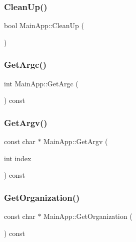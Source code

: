 \subsubsection{\texorpdfstring{CleanUp()}{CleanUp()}}
{\footnotesize\ttfamily bool Main\+App\+::\+Clean\+Up (\begin{DoxyParamCaption}{ }\end{DoxyParamCaption})}

\mbox{\label{class_main_app_a9a114ab6796b54d741bf2542432c2657}} 
\subsubsection{\texorpdfstring{GetArgc()}{GetArgc()}}
{\footnotesize\ttfamily int Main\+App\+::\+Get\+Argc (\begin{DoxyParamCaption}{ }\end{DoxyParamCaption}) const}

\mbox{\label{class_main_app_a380ad5dbdbfc0e00862af9ed2e31ce6b}} 
\subsubsection{\texorpdfstring{GetArgv()}{GetArgv()}}
{\footnotesize\ttfamily const char $\ast$ Main\+App\+::\+Get\+Argv (\begin{DoxyParamCaption}\item[{int}]{index }\end{DoxyParamCaption}) const}

\mbox{\label{class_main_app_aa5614899d2bedcdf809241ec8f09b3c7}} 
\subsubsection{\texorpdfstring{GetOrganization()}{GetOrganization()}}
{\footnotesize\ttfamily const char $\ast$ Main\+App\+::\+Get\+Organization (\begin{DoxyParamCaption}{ }\end{DoxyParamCaption}) const}

\mbox{\label{class_main_app_a66af164e7fdff787248470993f25d56f}} 

